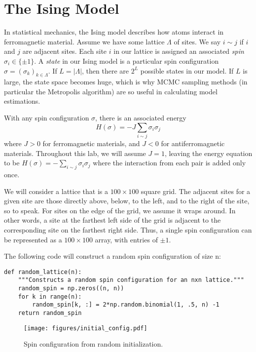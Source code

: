 \section*{The Ising Model}
In statistical mechanics, the Ising model describes how atoms interact in ferromagnetic material. Assume we have some lattice $\Lambda$ of sites. We say $i \sim j$ if $i$ and $j$ are adjacent sites. Each site $i$ in our lattice is assigned an associated \emph{spin} $\sigma_{i} \in \{\pm 1\}$. A \emph{state} in our Ising model is a particular spin configuration $\sigma = (\sigma_{k})_{k \in \Lambda}$. If $L = |\Lambda|$, then there are $2^{L}$ possible states in our model. If $L$ is large, the state space becomes huge, which is why MCMC sampling methods (in particular the Metropolis algorithm) are so useful in calculating model estimations.

With any spin configuration $\sigma$, there is an associated energy
\[
H(\sigma) = -J \sum_{i \sim j} \sigma_{i} \sigma_{j}
\]
 where $J > 0$ for ferromagnetic materials, and $J < 0$ for antiferromagnetic materials. Throughout this lab, we will assume $J = 1$, leaving the energy equation to be $H(\sigma) = -\sum_{i \sim j} \sigma_{i}\sigma_{j}$ where the interaction from each pair is added only once.

We will consider a lattice that is a $100 \times 100$ square grid.
The adjacent sites for a given site are those directly above, below, to the left, and to the right of the site, so to speak.
For sites on the edge of the grid, we assume it wraps around.
In other words, a site at the farthest left side of the grid is adjacent to the corresponding site on the farthest right side.
Thus, a single spin configuration can be represented as a $100 \times 100$ array, with entries of $\pm 1$.

The following code will construct a random spin configuration of size n:

\begin{lstlisting}
def random_lattice(n):
    """Constructs a random spin configuration for an nxn lattice."""
    random_spin = np.zeros((n, n))
    for k in range(n):
        random_spin[k, :] = 2*np.random.binomial(1, .5, n) -1
    return random_spin
\end{lstlisting}

\begin{figure}[H]
\centering
\texttt{[image: figures/initial\_config.pdf]}
\caption{Spin configuration from random initialization.}
\label{fig:random_spin}
\end{figure}

